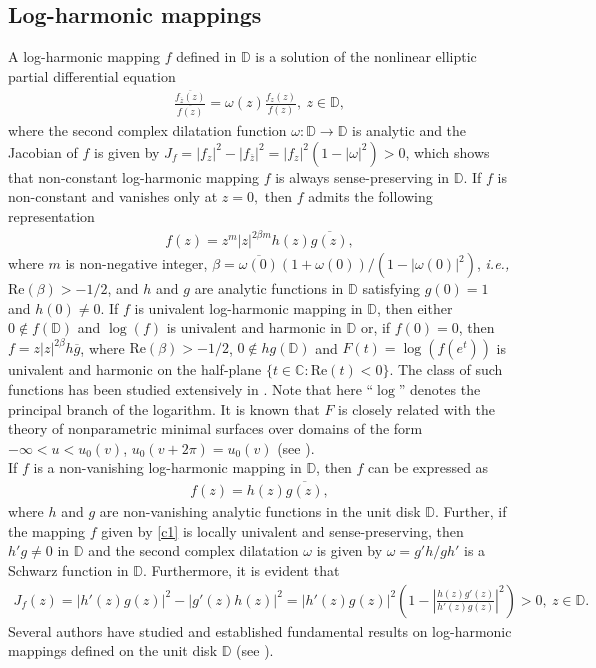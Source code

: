\documentclass[12pt,reqno]{amsart}
\newtheorem{open problem}{Open problem}[section]
\newcommand{\ol}{\overline}
\newcommand{\beas}{\begin{eqnarray*}}
\newcommand{\eeas}{\end{eqnarray*}}
\newcommand{\bea}{\begin{eqnarray}}
\newcommand{\eea}{\end{eqnarray}}
\numberwithin{equation}{section}
\begin{document}
\subsection{Log-harmonic mappings}
A log-harmonic mapping $f$ defined in $\mathbb{D}$ is a solution of the nonlinear elliptic partial differential equation
\bea\label{eq1}
\frac{\overline{f_{\overline{z}}(z)}}{\overline{f(z)}}=\omega(z)\frac{f_z(z)}{f(z)},~z\in\mathbb{D},\eea
where the second complex dilatation function $\omega:\mathbb{D}\to\mathbb{D}$ is analytic and the Jacobian of $f$ is given by $J_f=|f_z|^2-|f_{\overline{z}}|^2=|f_z|^2(1-|\omega|^2)>0$, which shows that non-constant log-harmonic mapping $f$ is always sense-preserving in $\mathbb{D}$. If $f$ is non-constant and vanishes only at $z = 0,$ then $f$ admits the following representation
\begin{align*}
f(z) = z^m|z|^{2\beta m}h(z)\overline{g(z)},
\end{align*}
where $m$ is non-negative integer, $\beta=\ol{\omega(0)}(1+\omega(0))/\left(1-|\omega(0)|^2\right)$, {\it i.e.,} $\textrm{Re}(\beta)>-1/2$, and $h$ and $g$ are analytic functions in $\mathbb{D}$ satisfying $g(0)=1$ and $h(0)\neq 0$. If $f$ is univalent 
log-harmonic mapping in $\mathbb{D}$, then either $0\not\in f(\mathbb{D})$ and $\log(f)$ is univalent and harmonic in $\mathbb{D}$ or, if $f(0)=0$, then 
$f=z |z|^{2\beta} h\ol{g}$, where $\text{Re}(\beta)>-1/2$, $0\not\in hg(\mathbb{D})$ and $F(t)=\log(f(e^t))$ is univalent and harmonic on the half-plane 
$\{t\in\mathbb{C}: \text{Re}(t)<0\}$. The class of such functions has been studied extensively in \cite{AB1988, AA2012, A1996}. Note that here ``$\log$'' denotes the principal branch of the logarithm. It is known that $F$ is closely 
related with the theory of nonparametric minimal surfaces over domains of the form $-\infty < u < u_0(v)$, $u_0(v+2\pi)=u_0(v)$ (see \cite{N1989}).\\[2mm]
\indent If $f$ is a non-vanishing log-harmonic mapping in $\mathbb{D}$, then $f$ can be expressed as
\bea\label{c1} f(z) = h(z)\overline{g(z)},\eea
where $h$ and $g$ are non-vanishing analytic functions in the unit disk $\mathbb{D}.$ Further, if the mapping $f$ given by \eqref{c1} is locally univalent and sense-preserving, then $h'g \neq 0$ in $\mathbb{D}$ and the second complex dilatation $\omega$ is given by $\omega=g'h/gh'$ is a Schwarz function in $\mathbb{D}$. Furthermore, it is evident that
\beas J_f(z)=|h'(z)g(z)|^2-|g'(z)h(z)|^2=|h'(z)g(z)|^2\left(1-\left|\frac{h(z)g'(z)}{h'(z)g(z)}\right|^2\right)>0,~z\in\mathbb{D}.\eeas
Several authors have studied and established fundamental results on log-harmonic mappings defined on the unit disk $\mathbb{D}$ (see \cite{BHPV2022, AA2012, 1LP2018}).
\end{document}
